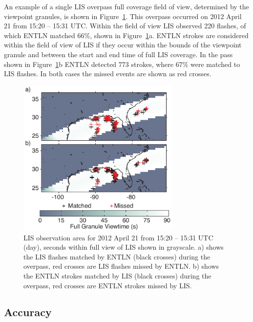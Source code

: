 An example of a single LIS overpass full coverage field of view, determined by the viewpoint granules, is shown in Figure~\ref{entln_lis:fig:overpass}.
This overpass occurred on 2012 April 21 from 15:20 -- 15:31 UTC.
Within the field of view LIS observed 220 flashes, of which ENTLN matched 66\%, shown in Figure~\ref{entln_lis:fig:overpass}a.
ENTLN strokes are considered within the field of view of LIS if they occur within the bounds of the viewpoint granule and between the start and end time of full LIS coverage.
In the pass shown in Figure~\ref{entln_lis:fig:overpass}b ENTLN detected 773 strokes, where 67\% were matched to LIS flashes.
In both cases the missed events are shown as red crosses.

\begin{figure}[t]
   \centering
   \noindent\includegraphics[width=19pc,angle=0]{entln_lis/Figures/overpass.pdf}
   \caption{LIS observation area for 2012 April 21 from 15:20 -- 15:31 UTC (day), seconds within full view of LIS shown in grayscale.
      		a) shows the LIS flashes matched by ENTLN (black crosses) during the overpass, red crosses are LIS flashes missed by ENTLN.
		b) shows the ENTLN strokes matched by LIS (black crosses) during the overpass, red crosses are ENTLN strokes missed by LIS.
		}
   \label{entln_lis:fig:overpass}
\end{figure}

\subsection{Accuracy}

